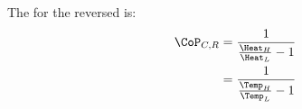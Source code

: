 The  for the reversed  is:
\begin{equation}\label{eq:Coefficient_of_Performance-Carnot_Cycle_Reversed}
  \begin{aligned}
    \CoP_{C, R} &= \frac{1}{\frac{\Heat_{H}}{\Heat_{L}} - 1} \\
    &= \frac{1}{\frac{\Temp_{H}}{\Temp_{L}} - 1} \\
  \end{aligned}
\end{equation}


